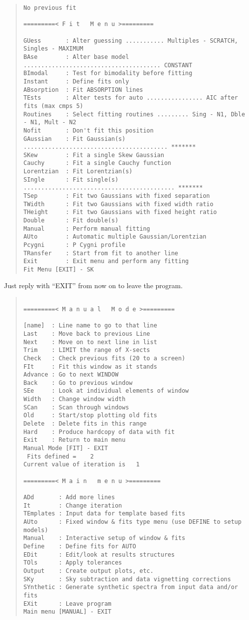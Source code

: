 \begin{quote}\begin{verbatim}
No previous fit
 
=========< F i t   M e n u >=========
 
GUess       : Alter guessing ........... Multiples - SCRATCH, Singles - MAXIMUM
BAse        : Alter base model ....................................... CONSTANT
BImodal     : Test for bimodality before fitting
Instant     : Define fits only
ABsorption  : Fit ABSORPTION lines
TEsts       : Alter tests for auto ................ AIC after fits (max cmps 5)
Routines    : Select fitting routines ......... Sing - N1, Dble - N1, Mult - N2
Nofit       : Don't fit this position
GAussian    : Fit Gaussian(s) ......................................... *******
SKew        : Fit a single Skew Gaussian
Cauchy      : Fit a single Cauchy function
Lorentzian  : Fit Lorentzian(s)
SIngle      : Fit single(s) ........................................... *******
TSep        : Fit two Gaussians with fixed separation
TWidth      : Fit two Gaussians with fixed width ratio
THeight     : Fit two Gaussians with fixed height ratio
Double      : Fit double(s)
Manual      : Perform manual fitting
AUto        : Automatic multiple Gaussian/Lorentzian
Pcygni      : P Cygni profile
TRansfer    : Start from fit to another line
Exit        : Exit menu and perform any fitting
Fit Menu [EXIT] - SK
\end{verbatim}\end{quote}
Just reply with ``EXIT'' from now on to leave the program.
\begin{quote}\begin{verbatim}
 
=========< M a n u a l   M o d e >=========
 
[name]  : Line name to go to that line
Last    : Move back to previous Line
Next    : Move on to next line in list
Trim    : LIMIT the range of X-sects
Check   : Check previous fits (20 to a screen)
FIt     : Fit this window as it stands
Advance : Go to next WINDOW
Back    : Go to previous window
SEe     : Look at individual elements of window
Width   : Change window width
SCan    : Scan through windows
Old     : Start/stop plotting old fits
Delete  : Delete fits in this range
Hard    : Produce hardcopy of data with fit
Exit    : Return to main menu
Manual Mode [FIT] - EXIT
 Fits defined =    2
Current value of iteration is   1
 
=========< M a i n   m e n u >=========
 
ADd       : Add more lines
It        : Change iteration
TEmplates : Input data for template based fits
AUto      : Fixed window & fits type menu (use DEFINE to setup models)
Manual    : Interactive setup of window & fits
Define    : Define fits for AUTO
EDit      : Edit/look at results structures
TOls      : Apply tolerances
Output    : Create output plots, etc.
SKy       : Sky subtraction and data vignetting corrections
SYnthetic : Generate synthetic spectra from input data and/or fits
EXit      : Leave program
Main menu [MANUAL] - EXIT
\end{verbatim}\end{quote}

